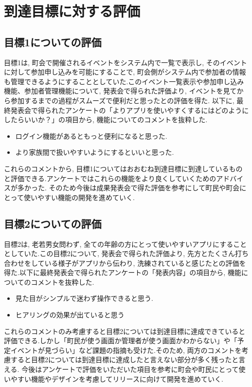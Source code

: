 \chapter{到達目標に対する評価}

\section{目標1についての評価}
目標1は, 町会で開催されるイベントをシステム内で一覧で表示し, そのイベントに対して参加申し込みを可能にすることで, 町会側がシステム内で参加者の情報も管理できるようにすることとしていた.このイベント一覧表示や参加申し込み機能、参加者管理機能について, 発表会で得られた評価より, イベントを見てから参加するまでの過程がスムーズで便利だと思ったとの評価を得た. 以下に, 最終発表会で得られたアンケートの「よりアプリを使いやすくするにはどのようにしたらいいか？」の項目から, 機能についてのコメントを抜粋した.

\begin{itemize}
    \item ログイン機能があるともっと便利になると思った.
    \item より家族間で扱いやすいようにするといいと思った.
\end{itemize}

これらのコメントから, 目標1についてはおおむね到達目標に到達しているものと評価できる.アンケートではこれらの機能をより良くしていくためのアドバイスが多かった. そのため今後は成果発表会で得た評価を参考にして町民や町会にとって使いやすい機能の開発を進めていく.
\section{目標2についての評価}
目標2は, 老若男女問わず, 全ての年齢の方にとって使いやすいアプリにすることとしていた.この目標2について, 発表会で得られた評価より, 先方とたくさん打ち合わせをしている様子がアプリから伝わり, 洗練されていると感じたとの評価を得た.以下に最終発表会で得られたアンケートの「発表内容」の項目から, 機能についてのコメントを抜粋した.

\begin{itemize}
    \item 見た目がシンプルで迷わず操作できると思う.
    \item ヒアリングの効果が出ていると思う
\end{itemize}

これらのコメントのみ考慮すると目標2については到達目標に達成できていると評価できる.しかし「町民が使う画面か管理者が使う画面かわからない」や「予定イベントが見づらい」など課題の指摘も受けた.そのため, 両方のコメントを考慮すると目標2については到達目標に達成したと言えない部分が多く残ったと言える.
今後はアンケートで評価をいただいた項目を参考に町会や町民にとって使いやすい機能やデザインを考慮してリリースに向けて開発を進めていく.
